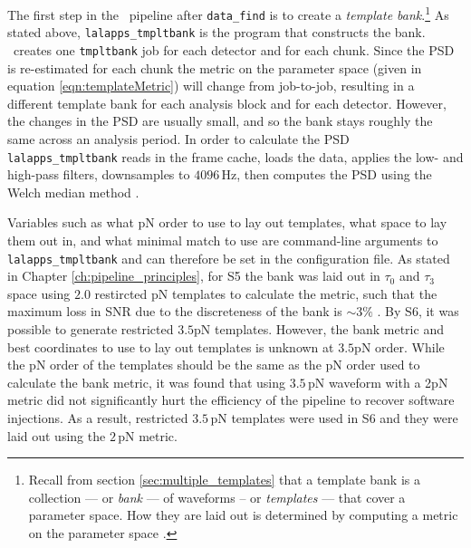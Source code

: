 The first step in the \hipe~pipeline after \verb|data_find| is to create a
\emph{template bank}.\footnote{Recall from section \ref{sec:multiple_templates}
that a template bank is a collection --- or \emph{bank} --- of waveforms -- or
\emph{templates} --- that cover a parameter space. How they are laid out is
determined by computing a metric on the parameter space \cite{Owen:1995tm,
Owen:1998dk, Tanaka:2000, BBCCS:2006, hexabank}.} As stated above,
\texttt{lalapps\_tmpltbank} is the program that constructs the bank.
\hipe~creates one \texttt{tmpltbank} job for each detector and for each chunk.
Since the \ac{PSD} is re-estimated for each chunk the metric on the parameter
space (given in equation \ref{eqn:templateMetric}) will change from job-to-job,
resulting in a different template bank for each analysis block and for each
detector. However, the changes in the \ac{PSD} are usually small, and so the
bank stays roughly the same across an analysis period. In order to calculate
the \ac{PSD} \texttt{lalapps\_tmpltbank} reads in the frame cache, loads the
data, applies the low- and high-pass filters, downsamples to $4096\,$Hz, then
computes the \ac{PSD} using the Welch median method \cite{Allen:2005fk}.

Variables such as what \ac{pN} order to use to lay out templates, what space to
lay them out in, and what minimal match to use are command-line arguments to
\texttt{lalapps\_tmpltbank} and can therefore be set in the configuration file.
As stated in Chapter \ref{ch:pipeline_principles}, for \ac{S5} the bank was
laid out in $\tau_0$ and $\tau_3$ space using $2.0$ restircted \ac{pN}
templates to calculate the metric, such that the maximum loss in \ac{SNR} due
to the discreteness of the bank is $\sim3\%$ \cite{Collaboration:2009tt,
Abbott:2009qj, Collaboration:S6CBClowmass}. By \ac{S6}, it was possible to
generate restricted $3.5$\ac{pN} templates. However, the bank metric and best
coordinates to use to lay out templates is unknown at $3.5$\ac{pN} order. While
the \ac{pN} order of the templates should be the same as the \ac{pN} order used
to calculate the bank metric, it was found that using $3.5\,$\ac{pN} waveform
with a 2\ac{pN} metric did not significantly hurt the efficiency of the
pipeline to recover software injections. As a result, restricted $3.5\,$\ac{pN}
templates were used in \ac{S6} and they were laid out using the $2\,$\ac{pN}
metric.

